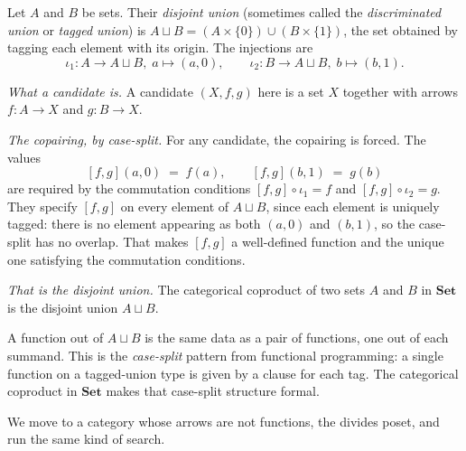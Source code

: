 \begin{example}\label{ex:set-coproduct}
Let $A$ and $B$ be sets. Their \textit{disjoint
union} (sometimes called the 
\textit{discriminated union} or 
\textit{tagged union}) is
$A \sqcup B = (A \times \{0\}) \cup (B \times \{1\})$, the set
obtained by tagging each element with its origin. The
injections are
\[ \iota_1 : A \to A \sqcup B, \; a \mapsto (a, 0), \qquad
   \iota_2 : B \to A \sqcup B, \; b \mapsto (b, 1). \]

\textit{What a candidate is.} A candidate $(X, f, g)$ here is a
set $X$ together with arrows $f : A \to X$ and $g : B \to X$.

\textit{The copairing, by case-split.} For any candidate, the
copairing is forced. The values
\[ [f, g](a, 0) \; = \; f(a), \qquad [f, g](b, 1) \; = \; g(b) \]
are required by the commutation conditions
$[f, g] \circ \iota_1 = f$ and $[f, g] \circ \iota_2 = g$. They
specify $[f, g]$ on every element of $A \sqcup B$, since each
element is uniquely tagged: there is no element appearing as
both $(a, 0)$ and $(b, 1)$, so the case-split has no overlap.
That makes $[f, g]$ a well-defined function and the unique one
satisfying the commutation conditions.

\textit{That is the disjoint union.} The categorical coproduct
of two sets $A$ and $B$ in $\mathbf{Set}$ is the disjoint union
$A \sqcup B$.
\end{example}

\noindent A function out of $A \sqcup B$ is the same data as a
pair of functions, one out of each summand. This is the
\textit{case-split} pattern from functional programming: a
single function on a tagged-union type is given by a clause for
each tag. The categorical coproduct in $\mathbf{Set}$ makes
that case-split structure formal.

\noindent We move to a category whose arrows are not functions,
the divides poset, and run the same kind of search.


